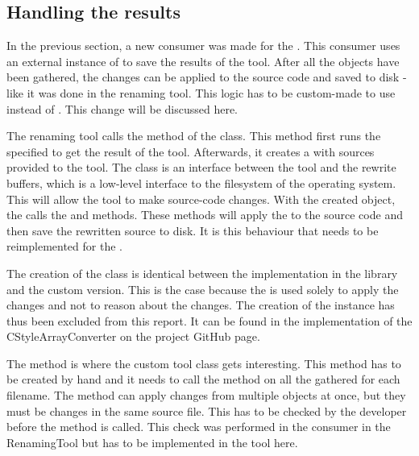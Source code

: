 \subsection{Handling the results}

In the previous section, a new consumer was made for the . This consumer uses an external instance of  to save the results of the tool. After all the  objects have been gathered, the changes can be applied to the source code and saved to disk - like it was done in the renaming tool. This logic has to be custom-made to use  instead of . This change will be discussed here.

The renaming tool calls the  method of the  class. This method first runs the specified  to get the result of the tool. Afterwards, it creates a  with sources provided to the tool. The  class is an interface between the tool and the rewrite buffers, which is a low-level interface to the filesystem of the operating system.
This  will allow the tool to make source-code changes. With the created  object, the  calls the  and  methods. These methods will apply the  to the source code and then save the rewritten source to disk. It is this behaviour that needs to be reimplemented for the .

The creation of the  class is identical between the implementation in the library and the custom version. This is the case because the  is used solely to apply the changes and not to reason about the changes. The creation of the  instance has thus been excluded from this report. It can be found in the implementation of the CStyleArrayConverter on the project GitHub page. 

The  method is where the custom tool class gets interesting. This method has to be created by hand and it needs to call the  method on all the gathered  for each filename. The  method can apply changes from multiple  objects at once, but they must be changes in the same source file.
This has to be checked by the developer before the method is called. This check was performed in the consumer in the RenamingTool but has to be implemented in the tool here. 

